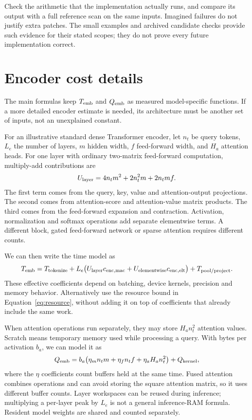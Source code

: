 Check the arithmetic that the implementation actually runs, and compare its output with
a full reference scan on the same inputs. Imagined failures do not justify extra patches. The small examples and archived candidate checks provide such evidence
for their stated scopes; they do not prove every future implementation correct.

\section{Encoder cost details}
The main formulas keep $T_{\rm emb}$ and $Q_{\rm emb}$ as measured model-specific functions.
If a more detailed encoder estimate is needed, its architecture must be another set of inputs,
not an unexplained constant.

For an illustrative standard dense Transformer encoder, let $n_t$ be query tokens, $L_e$ the
number of layers, $m$ hidden width, $f$ feed-forward width, and $H_a$ attention heads. For one
layer with ordinary two-matrix feed-forward computation, multiply-add contributions are
\begin{equation}
U_{\rm layer}=4n_t m^2+2n_t^2m+2n_tmf.
\end{equation}
The first term comes from the query, key, value and attention-output projections. The second
comes from attention-score and attention-value matrix products. The third comes from the
feed-forward expansion and contraction. Activation, normalization and softmax operations add
separate elementwise terms. A different block, gated feed-forward network or sparse attention
requires different counts.

We can then write the time model as
\[
T_{\rm emb}=T_{\rm tokenize}+L_e\big(U_{\rm layer}c_{\rm enc,mac}
 +U_{\rm elementwise}c_{\rm enc,elt}\big)+T_{\rm pool/project}.
\]
These effective coefficients depend on batching, device kernels, precision and memory behavior.
Alternatively use the resource bound in Equation~\eqref{eq:resource}, without adding it on top
of coefficients that already include the same work.

When attention operations run separately, they may store $H_a n_t^2$ attention values.
Scratch means temporary memory used while processing a query. With bytes per activation
$b_a$, we can model it as
\[
Q_{\rm emb}=b_a\big(\eta_m n_t m+\eta_f n_t f+\eta_a H_a n_t^2\big)+Q_{\rm kernel},
\]
where the $\eta$ coefficients count buffers held at the same time. Fused attention combines
operations and can avoid storing the square attention matrix, so it uses different buffer counts.
Layer workspaces can be reused during inference; multiplying a per-layer peak by $L_e$ is not
a general inference-RAM formula. Resident model weights are shared and counted separately.


